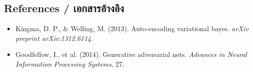 \subsection{References \quad / \quad \textthai{เอกสารอ้างอิง}}
\begin{itemize}
    \item Kingma, D. P., \& Welling, M. (2013). Auto-encoding variational bayes. \textit{arXiv preprint arXiv:1312.6114}.
    \item Goodfellow, I., et al. (2014). Generative adversarial nets. \textit{Advances in Neural Information Processing Systems}, 27.
\end{itemize}
